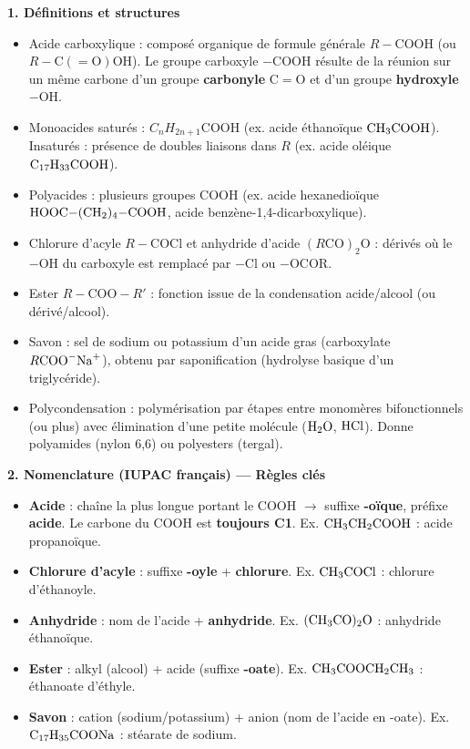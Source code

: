 \documentclass[11pt]{article}
\newcommand{\cle}[1]{{\popxbold\color{popdark}#1}}
\begin{document}
\begin{aretenir}

\textbf{1. Définitions et structures}
\begin{itemize}
  \item \cle{Acide carboxylique} : composé organique de formule générale \textbf{$R-\mathrm{COOH}$} (ou $R-\mathrm{C(=O)OH}$). Le \cle{groupe carboxyle} $-\mathrm{COOH}$ résulte de la réunion sur un même carbone d'un groupe \textbf{carbonyle} $\mathrm{C{=}O}$ et d'un groupe \textbf{hydroxyle} $-\mathrm{OH}$.
  \item \cle{Monoacides saturés} : $C_nH_{2n+1}\mathrm{COOH}$ (ex. acide éthanoïque $\ce{CH3COOH}$). \cle{Insaturés} : présence de doubles liaisons dans $R$ (ex. acide oléique $\ce{C17H33COOH}$).
  \item \cle{Polyacides} : plusieurs groupes $\mathrm{COOH}$ (ex. acide hexanedioïque $\ce{HOOC-(CH2)4-COOH}$, acide benzène-1,4-dicarboxylique).
  \item \cle{Chlorure d'acyle} $R-\mathrm{COCl}$ et \cle{anhydride d'acide} $(R\mathrm{CO})_2\mathrm{O}$ : dérivés où le $-\mathrm{OH}$ du carboxyle est remplacé par $-\mathrm{Cl}$ ou $-\mathrm{OCOR}$.
  \item \cle{Ester} $R-\mathrm{COO}-R'$ : fonction issue de la condensation acide/alcool (ou dérivé/alcool).
  \item \cle{Savon} : sel de sodium ou potassium d'un acide gras (carboxylate $R\mathrm{COO}^- \ce{Na^+}$), obtenu par \cle{saponification} (hydrolyse basique d'un triglycéride).
  \item \cle{Polycondensation} : polymérisation par étapes entre monomères bifonctionnels (ou plus) avec élimination d'une petite molécule ($\ce{H2O}$, $\ce{HCl}$). Donne polyamides (nylon 6,6) ou polyesters (tergal).
\end{itemize}

\textbf{2. Nomenclature (IUPAC français) — Règles clés}
\begin{itemize}
  \item \textbf{Acide} : chaîne la plus longue portant le $\mathrm{COOH}$ $\rightarrow$ suffixe \textbf{-oïque}, préfixe \textbf{acide}. Le carbone du $\mathrm{COOH}$ est \textbf{toujours C1}. Ex. $\ce{CH3CH2COOH}$ : acide propanoïque.
  \item \textbf{Chlorure d'acyle} : suffixe \textbf{-oyle} + \textbf{chlorure}. Ex. $\ce{CH3COCl}$ : chlorure d'éthanoyle.
  \item \textbf{Anhydride} : nom de l'acide + \textbf{anhydride}. Ex. $(\ce{CH3CO})_2\mathrm{O}$ : anhydride éthanoïque.
  \item \textbf{Ester} : alkyl (alcool) + acide (suffixe \textbf{-oate}). Ex. $\ce{CH3COOCH2CH3}$ : éthanoate d'éthyle.
  \item \textbf{Savon} : cation (sodium/potassium) + anion (nom de l'acide en -oate). Ex. $\ce{C17H35COONa}$ : stéarate de sodium.
\end{itemize}


\end{aretenir}
\end{document}
